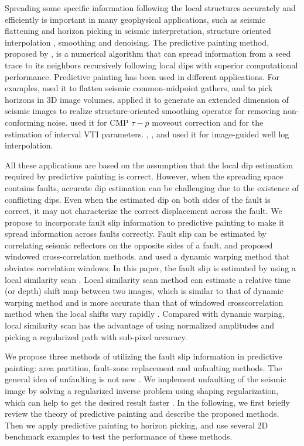 Spreading some specific information following the local structures accurately and efficiently is important in many geophysical applications, such as seismic flattening \cite[]{lomask03,parks10,wu15a,wu15b} and horizon picking in seismic interpretation, structure oriented interpolation \cite[]{swindeman15}, smoothing and denoising.
The predictive painting method, proposed by \cite{fomel10b}, is a numerical algorithm that can spread information from a seed trace to its neighbors recursively following local dips with superior computational performance.
Predictive painting has been used in different applications.
For examples, \cite{fomel10b} used it to flatten seismic common-midpoint gathers, and to pick horizons in 3D image volumes.
\cite{liu10} applied it to generate an extended dimension of seismic images to realize structure-oriented smoothing operator for removing non-conforming noise.
\cite{casasanta11} used it for CMP $\tau-p$ moveout correction and for the estimation of interval VTI parameters.
\cite{karimi15}, \cite{zhang16}, and \cite{shi17} used it for image-guided well log interpolation.

All these applications are based on the assumption that the local dip estimation required by predictive painting is correct.
However, when the spreading space contains faults, accurate dip estimation can be challenging due to the existence of conflicting dips.
Even when the estimated dip on both sides of the fault is correct, it may not characterize the correct displacement across the fault.
We propose to incorporate fault slip information to predictive painting to make it spread information across faults correctly.
Fault slip can be estimated by correlating seismic reflectors on the opposite sides of a fault.
\cite{aurnhammer05} and \cite{liang10} proposed windowed cross-correlation methods.
\cite{hale13} and \cite{wu16} used a dynamic warping method that obviates correlation windows.
In this paper, the fault slip is estimated by using a local similarity scan \cite[]{fomel07b,fomel09b}. 
Local similarity scan method can estimate a relative time (or depth) shift map between two images, 
which is similar to that of dynamic warping method 
and is more accurate than that of windowed crosscorrelation method when the local shifts vary rapidly \cite[]{hale13}.
Compared with dynamic warping, local similarity scan has the advantage of using normalized amplitudes and picking a regularized path with sub-pixel accuracy.

We propose three methods of utilizing the fault slip information in predictive painting:
area partition, fault-zone replacement and unfaulting methods.
The general idea of unfaulting is not new \cite[]{wei05,luo13,wu16}.
We implement unfaulting of the seismic image by solving a regularized inverse problem using shaping regularization, 
which can help to get the desired result faster \cite[]{fomel07}. 
In the following, we first briefly review the theory of predictive painting and describe the proposed methods.
Then we apply predictive painting to horizon picking, and use several 2D benchmark examples to test the performance of these methods.


